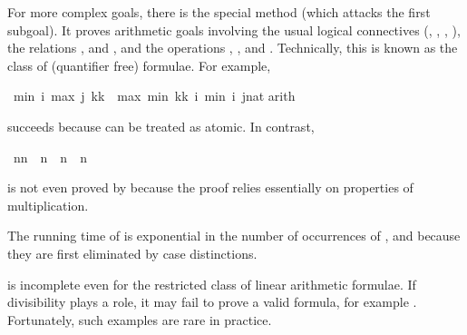 \begin{isabellebody}
\begin{isamarkuptext}
For more complex goals, there is the special method 
(which attacks the first subgoal). It proves arithmetic goals involving the
usual logical connectives (\isa{{\isasymnot}}, \isa{{\isasymand}}, \isa{{\isasymor}},
\isa{{\isasymlongrightarrow}}), the relations \isa{{\isacharequal}}, \isa{{\isasymle}} and \isa{{\isacharless}},
and the operations
\isa{{\isacharplus}}, \isa{{\isacharminus}},  and . Technically, this is
known as the class of (quantifier free)  formulae.
For example,%
\end{isamarkuptext}%
\ {\isachardoublequote}min\ i\ {\isacharparenleft}max\ j\ {\isacharparenleft}k{\isacharasterisk}k{\isacharparenright}{\isacharparenright}\ {\isacharequal}\ max\ {\isacharparenleft}min\ {\isacharparenleft}k{\isacharasterisk}k{\isacharparenright}\ i{\isacharparenright}\ {\isacharparenleft}min\ i\ {\isacharparenleft}j{\isacharcolon}{\isacharcolon}nat{\isacharparenright}{\isacharparenright}{\isachardoublequote}\isanewline
{}arith{\isacharparenright}%
\begin{isamarkuptext}%
\noindent
succeeds because  can be treated as atomic. In contrast,%
\end{isamarkuptext}%
\ {\isachardoublequote}n{\isacharasterisk}n\ {\isacharequal}\ n\ {\isasymLongrightarrow}\ n{\isacharequal}{}\ {\isasymor}\ n{\isacharequal}{}{\isachardoublequote}%
\begin{isamarkuptext}%
\noindent
is not even proved by  because the proof relies essentially
on properties of multiplication.

\begin{warn}
  The running time of  is exponential in the number of occurrences
  of ,  and
   because they are first eliminated by case distinctions.

   is incomplete even for the restricted class of
  linear arithmetic formulae. If divisibility plays a
  role, it may fail to prove a valid formula, for example
  . Fortunately, such examples are rare in practice.
\end{warn}%
\end{isamarkuptext}%
\end{isabellebody}%
